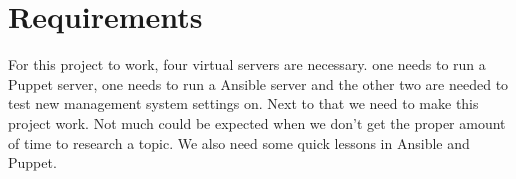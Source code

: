 \section{Requirements}\label{sec:requirements}
For this project to work, four virtual servers are necessary. one needs to run a Puppet server, one needs to run a Ansible server and the other two are needed to test new management system settings on.
Next to that we need to make this project work. Not much could be expected when we don't get the proper amount of time to research a topic. 
We also need some quick lessons in Ansible and Puppet. 
